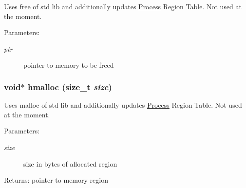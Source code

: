 Uses free of std lib and additionally updates \hyperlink{struct_process}{Process} Region Table. Not used at the moment. \begin{Desc}
\item[Parameters:]
\begin{description}
\item[{\em ptr}]pointer to memory to be freed \end{description}
\end{Desc}
\hypertarget{group___v_m_m___h_e_a_p_g3303e6b60e6122fb992cfc51ec01616f}{
\subsubsection[{hmalloc}]{\setlength{\rightskip}{0pt plus 5cm}void$\ast$ hmalloc (size\_\-t {\em size})}}
\label{group___v_m_m___h_e_a_p_g3303e6b60e6122fb992cfc51ec01616f}


Uses malloc of std lib and additionally updates \hyperlink{struct_process}{Process} Region Table. Not used at the moment. \begin{Desc}
\item[Parameters:]
\begin{description}
\item[{\em size}]size in bytes of allocated region \end{description}
\end{Desc}
\begin{Desc}
\item[Returns:]pointer to memory region \end{Desc}
